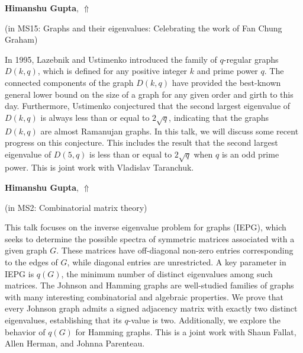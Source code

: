 \documentclass[ILAS2025-program.tex]{subfiles}
\begin{document}
\hypertarget{down0063}{}\begin{ilasabstract}
    
\textbf{Himanshu Gupta},  \hfill \hyperlink{up0063}{$\Uparrow$}
    
    
(in {\color{mstitle}MS15: Graphs and their eigenvalues: Celebrating the work of Fan Chung Graham})
        
\mtskip
    In 1995, Lazebnik and Ustimenko introduced the family of $q$-regular graphs $D(k, q)$, which is defined for any positive integer $k$ and prime power $q$. The connected components of the graph $D(k, q)$ have provided the best-known general lower bound on the size of a graph for any given order and girth to this day. Furthermore, Ustimenko conjectured that the second largest eigenvalue of $D(k, q)$ is always less than or equal to $2\sqrt{q}$, indicating that the graphs $D(k, q)$ are almost Ramanujan graphs. In this talk, we will discuss some recent progress on this conjecture. This includes the result that the second largest eigenvalue of $D(5, q)$ is less than or equal to $2\sqrt{q}$ when $q$ is an odd prime power. This is joint work with Vladislav Taranchuk.

\end{ilasabstract}
    

\hypertarget{down0264}{}\begin{ilasabstract}
    
\textbf{Himanshu Gupta},  \hfill \hyperlink{up0264}{$\Uparrow$}
    
    
(in {\color{mstitle}MS2: Combinatorial matrix theory})
        
\mtskip
    This talk focuses on the inverse eigenvalue problem for graphs (IEPG), which seeks to determine the possible spectra of symmetric matrices associated with a given graph $G$. These matrices have off-diagonal non-zero entries corresponding to the edges of $G$, while diagonal entries are unrestricted. A key parameter in IEPG is $q(G)$, the minimum number of distinct eigenvalues among such matrices. The Johnson and Hamming graphs are well-studied families of graphs with many interesting combinatorial and algebraic properties. We prove that every Johnson graph admits a signed adjacency matrix with exactly two distinct eigenvalues, establishing that its $q$-value is two. Additionally, we explore the behavior of $q(G)$ for Hamming graphs. This is a joint work with Shaun Fallat, Allen Herman, and Johnna Parenteau. 

\end{ilasabstract}
    
\end{document}
